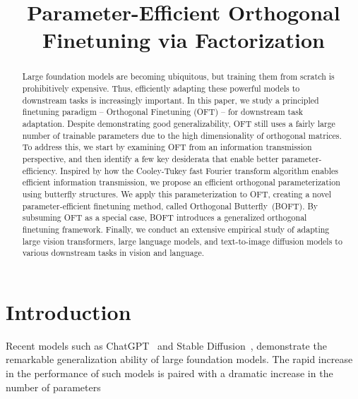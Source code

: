 \title{Parameter-Efficient Orthogonal Finetuning via Factorization}

\begin{abstract}
\vspace{-1.6mm}

Large foundation models are becoming ubiquitous, but training them from scratch is prohibitively expensive.
Thus, efficiently adapting these powerful models to downstream tasks is increasingly important. In this paper, we study a principled finetuning paradigm -- Orthogonal Finetuning (OFT) -- for downstream task adaptation. Despite demonstrating good generalizability, OFT still uses a fairly large number of trainable parameters due to the high dimensionality of orthogonal matrices. To address this, we start by examining OFT from an information transmission perspective, and then identify a few key desiderata that enable better parameter-efficiency. Inspired by how the Cooley-Tukey fast Fourier transform algorithm enables efficient information transmission, we propose an efficient orthogonal parameterization using  butterfly structures. We apply this parameterization to OFT, creating  a novel parameter-efficient finetuning method, called Orthogonal Butterfly~(BOFT). By subsuming OFT as a special case, BOFT introduces a generalized orthogonal finetuning framework. Finally, we conduct an extensive empirical study of adapting large vision transformers, large language models, and text-to-image diffusion models to various downstream tasks in vision and language.
\end{abstract}

\section{Introduction}
\vspace{-1.6mm}


Recent models such as ChatGPT~\cite{brown2020language,chen2021evaluating} and Stable Diffusion~\cite{rombach2022high}, demonstrate the remarkable generalization ability of large foundation models. The rapid increase in the performance of such models is paired with a dramatic increase in the number of parameters

